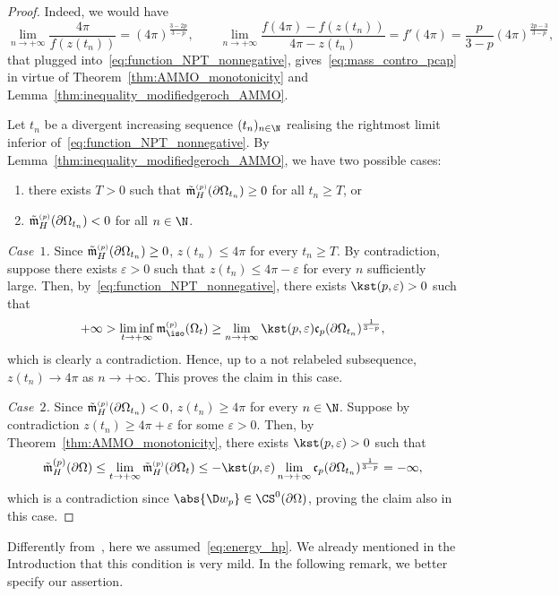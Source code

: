 \documentclass[10pt,a4paper]{amsart}
\numberwithin{equation}{section}
\newcounter{case}
\renewcommand{\ncapa}{\mathfrak{c}}
\newcommand{\ma}{\mathfrak{m}}
\newcommand{\tp}[1][p]{{\text{\tiny$(#1)$}}}
\begin{document}
\begin{proof}
Indeed, we would have
\[
 \lim_{n \to +\infty} \frac{4\pi}{f(z(t_n))} =(4 \pi )^{\frac{3-2p}{3-p}},\qquad \lim_{n\to +\infty}\frac{f(4 \pi )-f(z(t_n))}{4\pi-z(t_n)} = f'(4 \pi ) = \frac{p}{3-p} (4\pi)^{\frac{2p-3}{3-p}},
\]
that plugged into~\eqref{eq:function_NPT_nonnegative}, gives~\eqref{eq:mass_contro_pcap} in virtue of Theorem~\ref{thm:AMMO_monotonicity} and Lemma~\ref{thm:inequality_modifiedgeroch_AMMO}.

Let $t_n$ be a divergent increasing sequence $(t_n)_{n \in \N}$ realising the rightmost limit inferior of~\eqref{eq:function_NPT_nonnegative}. By Lemma~\ref{thm:inequality_modifiedgeroch_AMMO}, we have two possible cases:
\begin{enumerate}\itemsep=0pt
 \item[(1)] there exists $T>0$ such that $\tilde{\ma}^{\tp}_{H}(\partial \Omega_{t_n})\geq 0$ for all $t_n \geq T$, or
 \item[(2)] $\tilde{\ma}^{\tp}_{H}(\partial \Omega_{t_n})< 0$ for all $n\in \N$.
\end{enumerate}

\emph{Case~$1$.} Since $\tilde{\ma}^{\tp}_H(\partial \Omega_{t_n}) \geq 0 $, $z(t_n)\leq 4 \pi $ for every $t_n \geq T$. By contradiction, suppose there exists $\varepsilon>0$ such that $z(t_n) \leq 4 \pi - \varepsilon$ for every $n$ sufficiently large. Then, by~\eqref{eq:function_NPT_nonnegative}, there exists $\kst(p,\varepsilon)>0$ such that
\[
 +\infty>\liminf_{t\to +\infty} \ma^{\tp}_{\iso}(\Omega_{t}) \geq \lim_{n \to +\infty} \kst(p,\varepsilon)\ncapa_{p}(\partial \Omega_{t_n})^{\frac{1}{3-p}},
\]
which is clearly a contradiction. Hence, up to a not relabeled subsequence, $z(t_n) \to 4\pi$ as $n \to +\infty$. This proves the claim in this case.

\emph{Case~$2$.} %
Since $\tilde{\ma}^{\tp}_{H}(\partial \Omega_{t_n}) <0 $, $z(t_n) \geq 4 \pi$ for every $n\in \N$. Suppose by contradiction $z(t_n) \geq 4 \pi + \varepsilon$ for some $\varepsilon>0$. Then, by Theorem~\ref{thm:AMMO_monotonicity}, there exists $\kst(p,\varepsilon)>0$ such that
\[
 \tilde{\ma}^{(p)}_{H}(\partial \Omega) \leq \lim_{t \to +\infty} \tilde{\ma}^{\tp}_{H}(\partial \Omega_t) \leq -\kst(p,\varepsilon)\lim_{n \to +\infty}\ncapa_{p}(\partial \Omega_{t_n})^{\frac{1}{3-p}}=-\infty,
\]
which is a contradiction since $\abs{\D w_p} \in \CS^0(\partial \Omega)$, proving the claim also in this case.\end{proof}

Differently from~\cite[Lemma 2.7]{benatti_isoperimetricriemannianpenroseinequality_2022}, here we assumed~\eqref{eq:energy_hp}. We already mentioned in the Introduction that this condition is very mild. In the following remark, we better specify our assertion.
\end{document}
